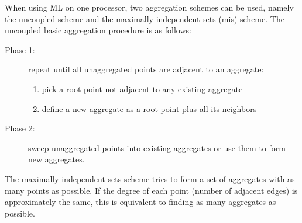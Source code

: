 When using ML on one processor, two aggregation schemes can be used, namely
the uncoupled scheme and the maximally independent sets (mis) scheme. The
uncoupled basic aggregation procedure is as follows:
\begin{description}
\item[Phase 1:] repeat until all unaggregated points are adjacent to an
aggregate:
\begin{enumerate}
\item pick a root point not adjacent to any existing aggregate
\item define a new aggregate as a root point plus all its neighbors
\end{enumerate}
\item[Phase 2:] sweep unaggregated points into existing aggregates or use them
to form new aggregates.
\end{description}
The maximally independent sets scheme tries to form a set of aggregates
with as many points as possible. If the degree of each point (number of
adjacent edges) is approximately the same, this is equivalent to finding as
many aggregates as possible.

